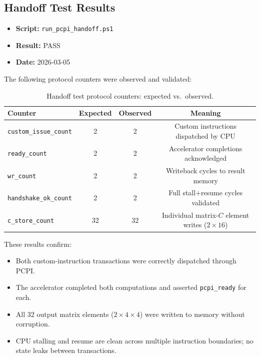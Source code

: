 ﻿\documentclass[12pt,a4paper]{report}
\renewcommand{\arraystretch}{1.2}
\begin{document}
\subsection{Handoff Test Results}

\begin{itemize}
    \item \textbf{Script:} \texttt{run\_pcpi\_handoff.ps1}
    \item \textbf{Result:} PASS
    \item \textbf{Date:} 2026-03-05
\end{itemize}

The following protocol counters were observed and validated:

\begin{table}[H]
\centering
\caption{Handoff test protocol counters: expected vs.\ observed.}
\label{tab:handoff_counters}
\small
\setlength{\tabcolsep}{10pt}
\renewcommand{\arraystretch}{1.3}
\begin{tabular}{lccc}
\toprule
\textbf{Counter} & \textbf{Expected} & \textbf{Observed} & \textbf{Meaning} \\
\midrule
\texttt{custom\_issue\_count}    & 2  & 2  & Custom instructions dispatched by CPU \\
\texttt{ready\_count}           & 2  & 2  & Accelerator completions acknowledged \\
\texttt{wr\_count}              & 2  & 2  & Writeback cycles to result memory \\
\texttt{handshake\_ok\_count}   & 2  & 2  & Full stall+resume cycles validated \\
\texttt{c\_store\_count}        & 32 & 32 & Individual matrix-$C$ element writes ($2 \times 16$) \\
\bottomrule
\end{tabular}
\end{table}

These results confirm:

\begin{itemize}
    \item Both custom-instruction transactions were correctly dispatched through PCPI.
    \item The accelerator completed both computations and asserted \texttt{pcpi\_ready} for each.
    \item All 32 output matrix elements ($2 \times 4 \times 4$) were written to memory without corruption.
    \item CPU stalling and resume are clean across multiple instruction boundaries; no state leaks between transactions.
\end{itemize}
\end{document}
